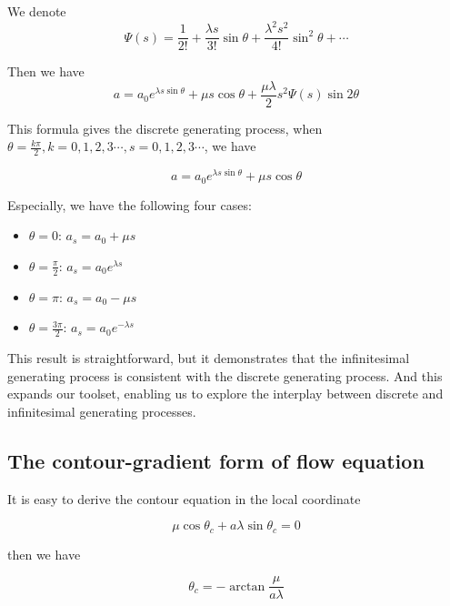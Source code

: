 \documentclass{article}
\numberwithin{definition}{section}
\numberwithin{lemma}{section}
\numberwithin{proposition}{section}
\numberwithin{corollary}{section}
\numberwithin{theorem}{section}
\begin{document}
We denote
\begin{equation}
    \Psi(s) = \frac{1}{2!} + \frac{\lambda s}{3!} \sin \theta + \frac{\lambda^2 s^2}{4!} \sin^2 \theta + \cdots
\end{equation}

Then we have
\begin{equation}
    a = a_0 e^{\lambda s \sin \theta} + \mu s \cos \theta + \frac{\mu\lambda}{2} s^2 \Psi(s) \sin 2\theta
\end{equation}

This formula gives the discrete generating process, when $\theta = \frac{k \pi}{2}, k = 0, 1, 2, 3\cdots, s = 0, 1, 2, 3\cdots$, we have

\begin{equation}
    a = a_0 e^{\lambda s \sin \theta} + \mu s \cos \theta
\end{equation}

Especially, we have the following four cases:
\begin{itemize}
    \item $\theta = 0$: $a_s = a_0 + \mu s$
    \item $\theta = \frac{\pi}{2}$: $a_s = a_0 e^{\lambda s}$
    \item $\theta = \pi$: $a_s = a_0 - \mu s$
    \item $\theta = \frac{3 \pi}{2}$: $a_s = a_0 e^{- \lambda s} $
\end{itemize}

This result is straightforward, but it demonstrates that the infinitesimal generating process is consistent with the discrete generating process.
And this expands our toolset, enabling us to explore the interplay between discrete and infinitesimal generating processes.

\subsection{The contour-gradient form of flow equation}\label{subsec:the-contour-gradient-form}

It is easy to derive the contour equation in the local coordinate

\begin{equation}
    \mu \cos \theta_c + a \lambda \sin \theta_c = 0\label{eq:contour}
\end{equation}

then we have

\begin{equation}
    \theta_c = - \arctan \frac{\mu}{a \lambda}\label{eq:contourangle}
\end{equation}
\end{document}
